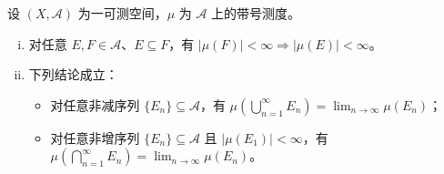\documentclass[../../main.tex]{subfiles}%
\begin{document}
\begin{remark}\label{remark:ch01-带号测度性质}
设 $(X,\mathcal{A})$ 为一可测空间，$\mu$ 为 $\mathcal{A}$ 上的带号测度。
\begin{enumerate}[(i)]
\item 对任意 $E,F\in\mathcal{A}$、$E\subseteq F$，有 $|\mu(F)|<\infty\Rightarrow|\mu(E)|<\infty$。
\item 下列结论成立：
\begin{itemize}
\item 对任意非减序列 $\{E_n\}\subseteq\mathcal{A}$，有 $\mu\left(\bigcup_{n=1}^\infty E_n\right)=\lim_{n\to\infty}\mu(E_n)$；
\item 对任意非增序列 $\{E_n\}\subseteq\mathcal{A}$ 且 $|\mu(E_1)|<\infty$，有 $\mu\left(\bigcap_{n=1}^\infty E_n\right)=\lim_{n\to\infty}\mu(E_n)$。
\end{itemize}
\end{enumerate}
\end{remark}
\end{document}
